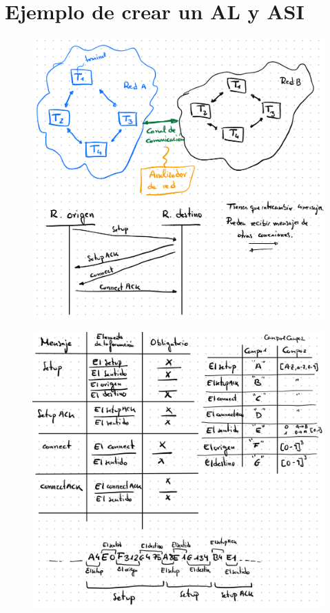 \documentclass[12pt, twoside, openright]{report} %
\begin{document}
\section{Ejemplo de crear un AL y ASI}

\begin{figure}[H]
	{\includegraphics[scale=.2]{image-20210305192603381.png}}
\end{figure}

\begin{figure}[H]
	{\includegraphics[scale=.3]{image-20210305192620642.png}}
\end{figure}
\end{document}
